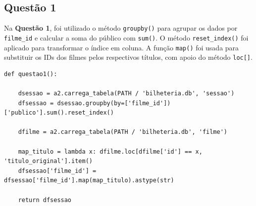\documentclass{article}
\begin{document}
\subsection*{Questão 1}
Na \textbf{Questão 1}, foi utilizado o método \texttt{groupby()} para agrupar os dados por \texttt{filme\_id} e calcular a soma do público com \texttt{sum()}. O método \texttt{reset\_index()} foi aplicado para transformar o índice em coluna. A função \texttt{map()} foi usada para substituir os IDs dos filmes pelos respectivos títulos, com apoio do método \texttt{loc[]}.
\linespread{1}
\begin{lstlisting}
def questao1():
    
    dsessao = a2.carrega_tabela(PATH / 'bilheteria.db', 'sessao')
    dfsessao = dsessao.groupby(by=['filme_id'])['publico'].sum().reset_index()

    dfilme = a2.carrega_tabela(PATH / 'bilheteria.db', 'filme')
    
    map_titulo = lambda x: dfilme.loc[dfilme['id'] == x, 'titulo_original'].item()
    dfsessao['filme_id'] =  dfsessao['filme_id'].map(map_titulo).astype(str)
    
    return dfsessao
\end{lstlisting}
\linespread{1.5}
\end{document}
